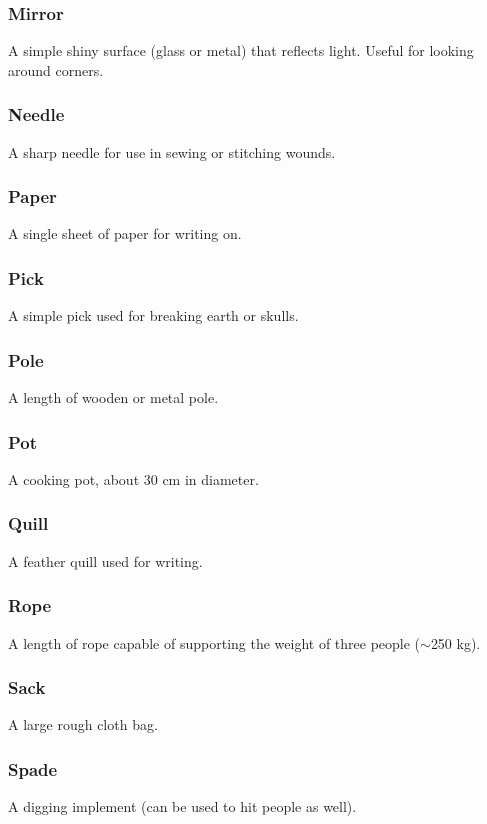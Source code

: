 \subsubsection*{Mirror}
A simple shiny surface (glass or metal) that reflects light. Useful for looking around corners.

\subsubsection*{Needle}
A sharp needle for use in sewing or stitching wounds.

\subsubsection*{Paper}
A single sheet of paper for writing on.

\subsubsection*{Pick}
A simple pick used for breaking earth or skulls.

\subsubsection*{Pole}
A length of wooden or metal pole.

\subsubsection*{Pot}
A cooking pot, about 30 cm in diameter.

\subsubsection*{Quill}
A feather quill used for writing.

\subsubsection*{Rope}
A length of rope capable of supporting the weight of three people ($\sim$250 kg).

\subsubsection*{Sack}
A large rough cloth bag.

\subsubsection*{Spade}
A digging implement (can be used to hit people as well).

